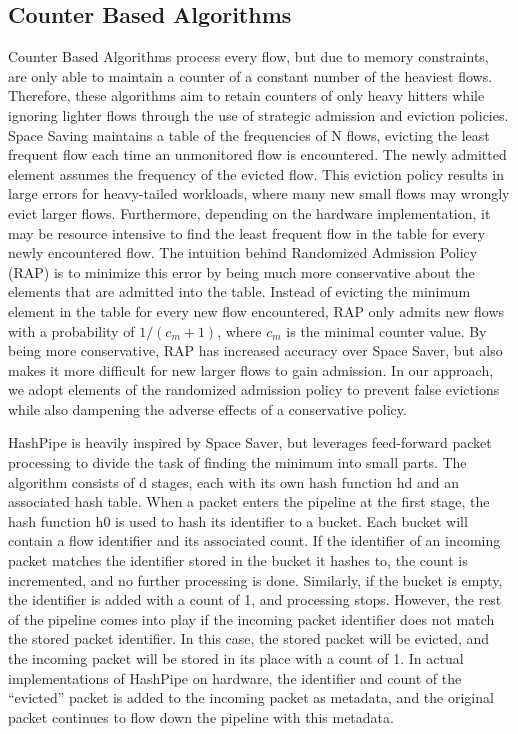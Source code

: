 \subsection{Counter Based Algorithms}
Counter Based Algorithms process every flow, but due to memory constraints, are only able to maintain a counter of a constant number of the heaviest flows. Therefore, these algorithms aim to retain counters of only heavy hitters while ignoring lighter flows through the use of strategic admission and eviction policies. Space Saving maintains a table of the frequencies of N flows, evicting the least frequent flow each time an unmonitored flow is encountered. The newly admitted element assumes the frequency of the evicted flow. This eviction policy results in large errors for heavy-tailed workloads, where many new small flows may wrongly evict larger flows. Furthermore, depending on the hardware implementation, it may be resource intensive to find the least frequent flow in the table for every newly encountered flow. 
The intuition behind Randomized Admission Policy (RAP) is to minimize this error by being much more conservative about the elements that are admitted into the table. Instead of evicting the minimum element in the table for every new flow encountered, RAP only admits new flows with a probability of $1/(c_m + 1)$, where $c_m$ is the minimal counter value. By being more conservative, RAP has increased accuracy over Space Saver, but also makes it more difficult for new larger flows to gain admission. In our approach, we adopt elements of the randomized admission policy to prevent false evictions while also dampening the adverse effects of a conservative policy. 

HashPipe is heavily inspired by Space Saver, but leverages feed-forward packet processing to divide the task of finding the minimum into small parts. The algorithm consists of d stages, each with its own hash function hd and an associated hash table. When a packet enters the pipeline at the first stage, the hash function h0 is used to hash its identifier to a bucket. Each bucket will contain a flow identifier and its associated count. If the identifier of an incoming packet matches the identifier stored in the bucket it hashes to, the count is incremented, and no further processing is done. Similarly, if the bucket is empty, the identifier is added with a count of 1, and processing stops. However, the rest of the pipeline comes into play if the incoming packet identifier does not match the stored packet identifier. In this case, the stored packet will be evicted, and the incoming packet will be stored in its place with a count of 1. In actual implementations of HashPipe on hardware, the identifier and count of the “evicted” packet is added to the incoming packet as metadata, and the original packet continues to flow down the pipeline with this metadata.

